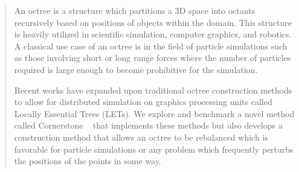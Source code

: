 \begin{abstract}

An octree is a structure which partitions a 3D space into octants recursively based on positions of objects within the domain. This structure is heavily utilized in scientific simulation, computer graphics, and robotics. A classical use case of an octree is in the field of particle simulations such as those involving short or long range forces where the number of particles required is large enough to become prohibitive for the simulation. 

Recent works have expanded upon traditional octree construction methods to allow for distributed simulation on graphics processing units called Locally Essential Trees (LETs). We explore and benchmark a novel method called Cornerstone ~\cite{cornerstone} that implements these methods but also develops a construction method that allows an octree to be rebalanced which is favorable for particle simulations or any problem which frequently perturbs the positions of the points in some way.

\end{abstract}
